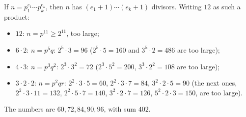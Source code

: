 If $n=p_1^{e_1}\cdots p_k^{e_k}$, then $n$ has $(e_1+1)\cdots(e_k+1)$ divisors. Writing $12$ as such a product:
\begin{itemize}
\item $12$: $n=p^{11}\ge2^{11}$, too large;
\item $6\cdot2$: $n=p^5q$: $2^5\cdot3=96$ ($2^5\cdot5=160$ and $3^5\cdot2=486$ are too large);
\item $4\cdot3$: $n=p^3q^2$: $2^3\cdot3^2=72$ ($2^3\cdot5^2=200$, $3^3\cdot2^2=108$ are too large);
\item $3\cdot2\cdot2$: $n=p^2qr$: $2^2\cdot3\cdot5=60$, $2^2\cdot3\cdot7=84$, $3^2\cdot2\cdot5=90$ (the next ones, $2^2\cdot3\cdot11=132$, $2^2\cdot5\cdot7=140$, $3^2\cdot2\cdot7=126$, $5^2\cdot2\cdot3=150$, are too large).
\end{itemize}
The numbers are $60,72,84,90,96$, with sum $\boxed{402}$.
